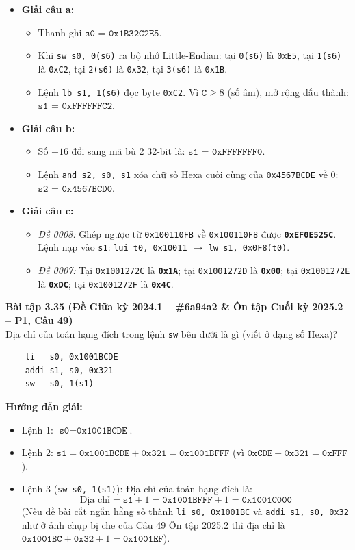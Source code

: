 \begin{itemize}
    \item \textbf{Giải câu a:}
    \begin{itemize}
        \item Thanh ghi $\mathbf{\texttt{s0 = 0x1B32C2E5}}$.
        \item Khi \texttt{sw s0, 0(s6)} ra bộ nhớ Little-Endian: tại \texttt{0(s6)} là \texttt{0xE5}, tại \texttt{1(s6)} là \texttt{0xC2}, tại \texttt{2(s6)} là \texttt{0x32}, tại \texttt{3(s6)} là \texttt{0x1B}.
        \item Lệnh \texttt{lb s1, 1(s6)} đọc byte \texttt{0xC2}. Vì $\texttt{C} \ge 8$ (số âm), mở rộng dấu thành: $\mathbf{\texttt{s1 = 0xFFFFFFC2}}$.
    \end{itemize}
    \item \textbf{Giải câu b:}
    \begin{itemize}
        \item Số $-16$ đổi sang mã bù 2 32-bit là: $\mathbf{\texttt{s1 = 0xFFFFFFF0}}$.
        \item Lệnh \texttt{and s2, s0, s1} xóa chữ số Hexa cuối cùng của \texttt{0x4567BCDE} về 0: $\mathbf{\texttt{s2 = 0x4567BCD0}}$.
    \end{itemize}
    \item \textbf{Giải câu c:}
    \begin{itemize}
        \item \textit{Đề 0008:} Ghép ngược từ \texttt{0x100110FB} về \texttt{0x100110F8} được \textbf{\texttt{0xEF0E525C}}. Lệnh nạp vào \texttt{s1}: \texttt{lui t0, 0x10011} $\rightarrow$ \texttt{lw s1, 0x0F8(t0)}.
        \item \textit{Đề 0007:} Tại \texttt{0x1001272C} là \textbf{\texttt{0x1A}}; tại \texttt{0x1001272D} là \textbf{\texttt{0x00}}; tại \texttt{0x1001272E} là \textbf{\texttt{0xDC}}; tại \texttt{0x1001272F} là \textbf{\texttt{0x4C}}.
    \end{itemize}
\end{itemize}

\textbf{Bài tập 3.35 (Đề Giữa kỳ 2024.1 -- \#6a94a2 \& Ôn tập Cuối kỳ 2025.2 -- P1, Câu 49)}\\
Địa chỉ của toán hạng đích trong lệnh \texttt{sw} bên dưới là gì (viết ở dạng số Hexa)?
\begin{lstlisting}
    li   s0, 0x1001BCDE
    addi s1, s0, 0x321
    sw   s0, 1(s1)
\end{lstlisting}
\textbf{Hướng dẫn giải:}
\begin{itemize}
    \item Lệnh 1: $\texttt{s0} = \texttt{0x1001BCDE}$.
    \item Lệnh 2: $\texttt{s1} = \texttt{0x1001BCDE} + \texttt{0x321} = \texttt{0x1001BFFF}$ (vì $\texttt{0xCDE} + \texttt{0x321} = \texttt{0xFFF}$).
    \item Lệnh 3 (\texttt{sw s0, 1(s1)}): Địa chỉ của toán hạng đích là:
    $$\text{Địa chỉ} = \texttt{s1} + 1 = \texttt{0x1001BFFF} + 1 = \mathbf{\texttt{0x1001C000}}$$
    (Nếu đề bài cắt ngắn hằng số thành \texttt{li s0, 0x1001BC} và \texttt{addi s1, s0, 0x32} như ở ảnh chụp bị che của Câu 49 Ôn tập 2025.2 thì địa chỉ là $\texttt{0x1001BC} + \texttt{0x32} + 1 = \mathbf{\texttt{0x1001EF}}$).
\end{itemize}
